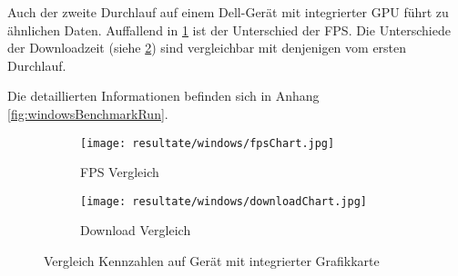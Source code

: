 Auch der zweite Durchlauf auf einem Dell-Gerät mit integrierter \gls{GPU} führt zu ähnlichen Daten. Auffallend in \ref{fig:benchmarkFpsChartWindows} ist der Unterschied der \gls{FPS}. Die Unterschiede der Downloadzeit (siehe \ref{fig:benchmarkDownloadChartWindows}) sind vergleichbar mit denjenigen vom ersten Durchlauf.

Die detaillierten Informationen befinden sich in Anhang \ref{fig:windowsBenchmarkRun}.

\begin{figure}[H]
  \centering
  \begin{subfigure}{.49\textwidth}
    \centering
    \texttt{[image: resultate/windows/fpsChart.jpg]}
    \caption{FPS Vergleich}
    \label{fig:benchmarkFpsChartWindows}
  \end{subfigure}
  \begin{subfigure}{.49\textwidth}
    \centering
    \texttt{[image: resultate/windows/downloadChart.jpg]}
    \caption{Download Vergleich}
    \label{fig:benchmarkDownloadChartWindows}
  \end{subfigure}
  \caption{Vergleich Kennzahlen auf Gerät mit integrierter Grafikkarte}
  \label{fig:benchmarkChartWindows}
\end{figure}
